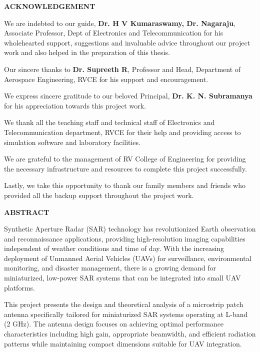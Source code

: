 \documentclass[12pt]{article}
\begin{document}
\newpage
\thispagestyle{empty}

\begin{center}
{\Large \textbf{ACKNOWLEDGEMENT}}
\end{center}

\vspace{1.5cm}

We are indebted to our guide, \textbf{Dr. H V Kumaraswamy, Dr. Nagaraju}, Associate Professor, Dept of Electronics and Telecommunication for his wholehearted support, suggestions and invaluable advice throughout our project work and also helped in the preparation of this thesis.

Our sincere thanks to \textbf{Dr. Supreeth R}, Professor and Head, Department of Aerospace Engineering, RVCE for his support and encouragement.

We express sincere gratitude to our beloved Principal, \textbf{Dr. K. N. Subramanya} for his appreciation towards this project work.

We thank all the teaching staff and technical staff of Electronics and Telecommunication department, RVCE for their help and providing access to simulation software and laboratory facilities.

We are grateful to the management of RV College of Engineering for providing the necessary infrastructure and resources to complete this project successfully.

Lastly, we take this opportunity to thank our family members and friends who provided all the backup support throughout the project work.

\newpage

\begin{center}
{\Large \textbf{ABSTRACT}}
\end{center}

\vspace{1cm}

Synthetic Aperture Radar (SAR) technology has revolutionized Earth observation and reconnaissance applications, providing high-resolution imaging capabilities independent of weather conditions and time of day. With the increasing deployment of Unmanned Aerial Vehicles (UAVs) for surveillance, environmental monitoring, and disaster management, there is a growing demand for miniaturized, low-power SAR systems that can be integrated into small UAV platforms.

This project presents the design and theoretical analysis of a microstrip patch antenna specifically tailored for miniaturized SAR systems operating at L-band (2 GHz). The antenna design focuses on achieving optimal performance characteristics including high gain, appropriate beamwidth, and efficient radiation patterns while maintaining compact dimensions suitable for UAV integration.
\end{document}
